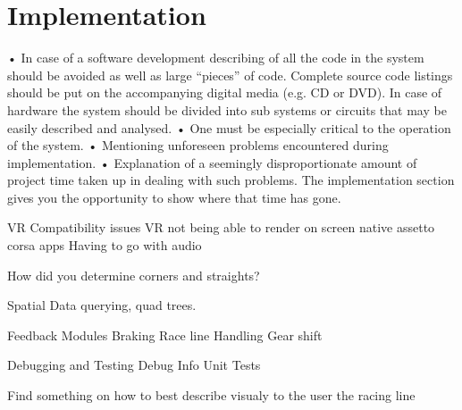 \section{Implementation}

• In case of a software development describing of all the code in the system should be avoided as well as large “pieces” of code. Complete source code listings should be put on the accompanying digital media (e.g. CD or DVD). In case of hardware the system should be divided into sub systems or circuits that may be easily described and analysed.
• One must be especially critical to the operation of the system.
• Mentioning unforeseen problems encountered during implementation.
• Explanation of a seemingly disproportionate amount of project time taken up in dealing with such problems. The implementation section gives you the opportunity to show where that time has gone. 

VR Compatibility issues
VR not being able to render on screen native assetto corsa apps
Having to go with audio

How did you determine corners and straights?

Spatial Data querying, quad trees.

Feedback Modules
	Braking
	Race line
	Handling
	Gear shift
	
Debugging and Testing
	Debug Info
	Unit Tests


Find something on how to best describe visualy to the user the racing line